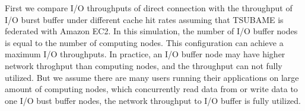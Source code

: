 

First we compare I/O throughputs of direct connection with the throughput of  I/O burst buffer under different cache hit rates assuming that TSUBAME is federated with Amazon EC2.
In this simulation, the number of I/O buffer nodes is equal to the number of computing nodes. This configuration can achieve a maximum I/O throughputs.
In practice, an I/O buffer node may have higher network throghput than computing nodes, and the throughput can not fully utilized.
But we assume there are many users running their applications on large amount of computing nodes, which concurrently read data from or write data to one I/O bust buffer nodes, the network throughput to I/O buffer is fully utilized.


